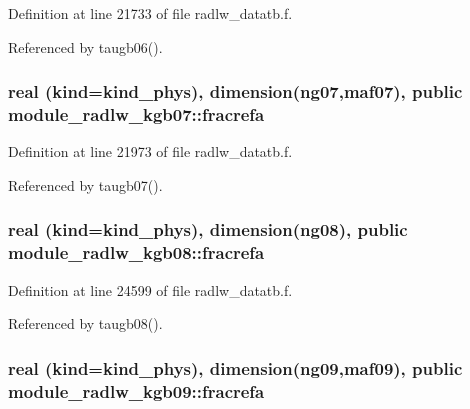 Definition at line 21733 of file radlw\+\_\+datatb.\+f.



Referenced by taugb06().

\subsubsection[{\texorpdfstring{fracrefa}{fracrefa}}]{\setlength{\rightskip}{0pt plus 5cm}real (kind=kind\+\_\+phys), dimension(ng07,maf07), public module\+\_\+radlw\+\_\+kgb07\+::fracrefa}\hypertarget{group__module__radlw__main_ga07f2a4a0f1152a65aed68623f14a9ae4}{}\label{group__module__radlw__main_ga07f2a4a0f1152a65aed68623f14a9ae4}


Definition at line 21973 of file radlw\+\_\+datatb.\+f.



Referenced by taugb07().

\subsubsection[{\texorpdfstring{fracrefa}{fracrefa}}]{\setlength{\rightskip}{0pt plus 5cm}real (kind=kind\+\_\+phys), dimension(ng08), public module\+\_\+radlw\+\_\+kgb08\+::fracrefa}\hypertarget{group__module__radlw__main_gad1a59ffb362cd72537df9c1916c07621}{}\label{group__module__radlw__main_gad1a59ffb362cd72537df9c1916c07621}


Definition at line 24599 of file radlw\+\_\+datatb.\+f.



Referenced by taugb08().

\subsubsection[{\texorpdfstring{fracrefa}{fracrefa}}]{\setlength{\rightskip}{0pt plus 5cm}real (kind=kind\+\_\+phys), dimension(ng09,maf09), public module\+\_\+radlw\+\_\+kgb09\+::fracrefa}\hypertarget{group__module__radlw__main_gace3d3e2731609f7ea50eb798bd212f3b}{}\label{group__module__radlw__main_gace3d3e2731609f7ea50eb798bd212f3b}


